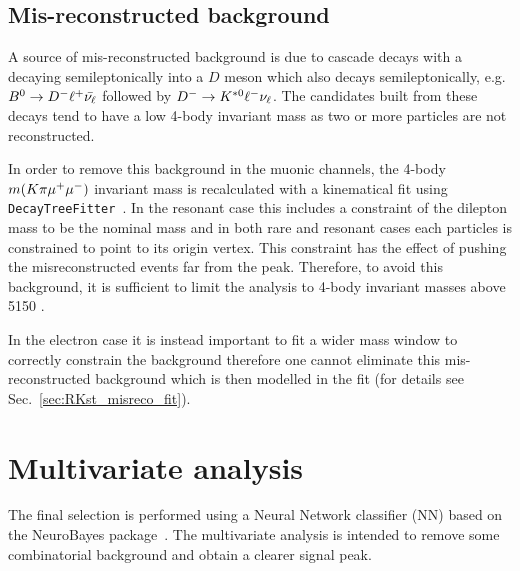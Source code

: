 \subsection{Mis-reconstructed background}
\label{sec:RKst_peaking_Dchains}

A source of mis-reconstructed background is due to cascade decays with a \Bz decaying semileptonically
into a $D$ meson which also decays semileptonically, e.g. ${{B}^0}\rightarrow D^{-} \ell^+ \bar{\nu_\ell}$
followed by $D^{-} \rightarrow {\ensuremath{{K}^{*0}}} \ell^- \nu_\ell$. The candidates built from these decays tend to have a low
4-body invariant mass as two or more particles are not reconstructed.

In order to remove this background in the muonic channels, the 4-body $m(K\pi\mumu)$ invariant mass is recalculated
with a kinematical fit using \verb!DecayTreeFitter!~\cite{DTF_twiki}. In the resonant case this includes a constraint of the dilepton
mass to be the \jpsi nominal mass and in both rare and resonant cases each particles is constrained to point to 
its origin vertex. This constraint has the effect of pushing the misreconstructed events far from the \Bz peak.
Therefore, to avoid this background, it is sufficient to limit the analysis to 4-body invariant masses
above 5150 \mevcc.

In the electron case it is instead important to fit a wider mass window to correctly constrain the background
therefore one cannot eliminate this mis-reconstructed background which is then modelled in the fit
(for details see Sec.~\ref{sec:RKst_misreco_fit}).


\section{Multivariate analysis}
\label{sec:RKst_mva}

The final selection is performed using a Neural Network classifier (NN) based on the NeuroBayes
package~\cite{Feindt:2006pm,feindt-2004}. The multivariate analysis is intended to remove
some combinatorial background and obtain a clearer signal peak.

